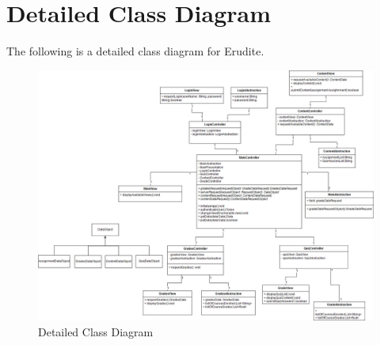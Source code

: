 \documentclass[]{article}
\begin{document}
\section{Detailed Class Diagram}
\label{sec:detailed_class_diagram}
The following is a detailed class diagram for Erudite.
\begin{figure}[H]
  \centering
  \includegraphics[scale=0.3]{A3_Assets/DetailedClassDiagram.jpg}
  \caption{Detailed Class Diagram}
\end{figure}


\newpage
\appendix
\end{document}
